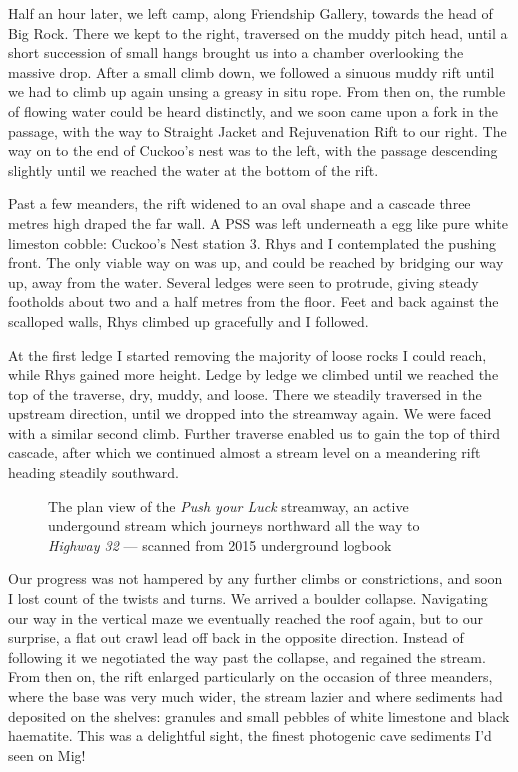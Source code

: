 Half an hour later, we left camp, along Friendship Gallery, towards the head of Big Rock. There we kept to the right, traversed on the muddy pitch head, until a short succession of small hangs brought us into a chamber overlooking the massive drop. After a small climb down, we followed a sinuous muddy rift until we had to climb up again unsing a greasy in situ rope. From then on, the rumble of flowing water could be heard distinctly, and we soon came upon a fork in the passage, with the way to Straight Jacket and Rejuvenation Rift to our right. The way on to the end of Cuckoo's nest was to the left, with the passage descending slightly until we reached the water at the bottom of the rift.

Past a few meanders, the rift widened to an oval shape and a cascade three metres high draped the far wall. A PSS was left underneath a egg like pure white limeston cobble: Cuckoo's Nest station 3. Rhys and I contemplated the pushing front. The only viable way on was up, and could be reached by bridging our way up, away from the water. Several ledges were seen to protrude, giving steady footholds about two and a half metres from the floor. Feet and back against the scalloped walls, Rhys  climbed up gracefully and I followed.

At the first ledge I started removing the majority of loose rocks I could reach, while Rhys gained more height. Ledge by ledge we climbed until we reached the top of the traverse, dry, muddy, and loose. There we steadily traversed in the upstream direction, until we dropped into the streamway again. We were faced with a similar second climb. Further traverse enabled us to gain the top of third cascade, after which we continued almost a stream level on a meandering rift heading steadily southward.

\begin{figure}[t!]
\checkoddpage \ifoddpage \forcerectofloat \else \forceversofloat \fi
\centering
{}
\caption{The plan view of the \emph{Push your Luck} streamway, an active undergound stream which journeys northward all the way to \emph{Highway 32} --- scanned from 2015 underground logbook}
\label{}
\end{figure}

Our progress was not hampered by any further climbs or constrictions, and soon I lost count of the twists and turns. We arrived a boulder collapse. Navigating our way in the vertical maze we eventually reached the roof again, but to our surprise, a flat out crawl lead off back in the opposite direction. Instead of following it we negotiated the way past the collapse, and regained the stream. From then on, the rift enlarged particularly on the occasion of three meanders, where the base was very much wider, the stream lazier and where sediments had deposited on the shelves: granules and small pebbles of white limestone and black haematite. This was a delightful sight, the finest photogenic cave sediments I'd seen on Mig! 

